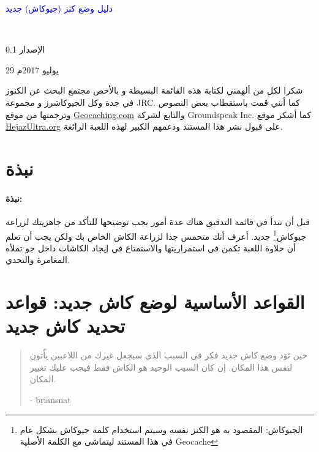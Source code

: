 \documentclass[12pt,a4paper,onecolumn,notitlepage]{book}
\providecommand{\HUGE}{\Huge}%
\newlength{\drop}%
\newcommand*{\titleLL}{\begingroup%
\drop=0.1\textheight
\fboxsep 0.5\baselineskip
\sffamily
\vspace*{\drop}
\centering
{\textcolor{Blue}{\HUGE دليل وضع كنز (جيوكاش) جديد}}\par
\vspace{0.5\drop}
\colorbox{babyblueeyes}{\textcolor{white}{\normalfont\itshape\Large{\DiwanTitle تأليف: يُوسُف عَدنَان رَفـَّــه}}}\par


\vspace{\drop}
\footnotesize{\par{الإصدار 0.1}}

\vspace{\drop}
\begin{center}
	\color{slategray2Light}
	{\fontsize{70}{84}\selectfont \textsection}
\end{center}
\vfill

{\footnotesize{29 يوليو 2017م}}\par
\vspace*{\drop}
\endgroup}
\newenvironment{dedication}
{
\clearpage
\vspace*{\stretch{1}}
\hfill\begin{minipage}[t]{0.66\textwidth}
\raggedleft

}%
{
\end{minipage}
\vspace*{\stretch{3}}
\begin{center}
\color{slategray2}
{\HUGE\Pisces}
\end{center}
}
\begin{document}
\titleLL
\begin{center}
	\color{slategray2VeryLight}
	{\HUGE\Pisces}
\end{center}



\begin{dedication}
{\Huge\color{slategray2Gray}{{\fontsize{80}{90}\selectfont \}}{\color{slategray2}{\DiwanT شُكْرٌ وإِهْداءْ}}\par}}\vspace{38pt}شكرا لكل من ألهمني لكتابة هذه القائمة البسيطة و بالأخص مجتمع البحث عن الكنوز في جدة وكل الجيوكاشرز و مجموعة \textenglish{JRC}. كما أنني قمت باستقطاب بعض النصوص وترجمتها من موقع \textenglish{\href{http://www.Geocaching.com}{Geocaching.com}} والتابع لشركة \textenglish{Groundspeak Inc.}
		كما أشكر موقع \textenglish{\href{http://www.HejazUltra.org}{HejazUltra.org}} على قبول نشر هذا المستند ودعمهم الكبير لهذه اللعبة الرائعة.
\end{dedication}

\newpage

	
\pagestyle{fancy}
\section*{نبذة}
\paragraph{نبذة:} %
\label{par:نبذة}
قبل أن نبدأ في قائمة التدقيق هناك عدة أمور يجب توضيحها للتأكد من جاهزيتك لزراعة جيوكاش\footnote{الجيوكاش: المقصود به هو الكنز نفسه وسيتم استخدام كلمة جيوكاش بشكل عام في هذا المستند ليتماشى مع الكلمة الأصلية \textenglish{Geocache}} جديد.
أعرف أنك متحمس جدا لزراعة الكاش الخاص بك ولكن يجب أن تعلم أن حلاوة اللعبة تكمن في استمراريتها والاستمتاع في إيجاد الكاشات داخل جو تملأه المغامرة والتحدي.




\newpage

\section*{القواعد الأساسية لوضع كاش جديد: قواعد تحديد كاش جديد}
\label{sec:قواعد تحديد كاش جديد}

\begin{quotation}

\textcolor{slategray2Dark}{}\textcolor{gray}{حين تَوَد وضع كاش جديد فكر في السبب الذي سيجعل غيرك من اللاعبين يأتون لنفس هذا المكان. إن كان السبب الوحيد هو الكاش فقط فيجب عليك تغيير المكان.}

\textcolor{slategray2Dark}{}  - \textenglish{briansnat}

\end{quotation}
\end{document}
